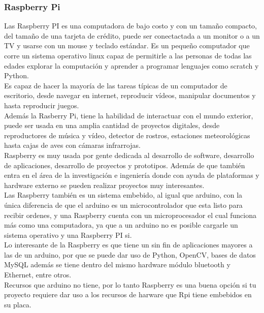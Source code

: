 \documentclass[12pt,titlepage]{article}
\begin{document}
\subsubsection{Raspberry Pi}
Las Raspberry PI es una computadora de bajo costo y con un tamaño compacto, del tamaño de una tarjeta de crédito, puede ser conectactada a un monitor o a un TV y usarse con un mouse y teclado estándar. Es un pequeño computador que corre un sistema operativo linux capaz de permitirle a las personas de todas las edades explorar la computación y aprender a programar lenguajes como scratch y Python. \\ 
Es capaz de hacer la mayoría de las tareas típicas de un computador de escritorio, desde navegar en internet, reproducir vídeos, manipular documentos y hasta reproducir juegos. \\[0.8mm]

Además la Rasberry Pi, tiene la habilidad de interactuar con el mundo exterior, puede ser usada en una amplia cantidad de proyectos digitales, desde reproductores de música y vídeo, detector de rostros, estaciones meteorológicas hasta cajas de aves con cámaras infrarrojas. \\[0.8mm]

Raspberry es muy usada por gente dedicada al desarrollo de software, desarrollo de aplicaciones, desarrollo de proyectos y prototipos. Además de que también entra en el área de la investigación e ingeniería donde con ayuda de plataformas y hardware externo se pueden realizar proyectos muy interesantes. \\[0.8mm]

Las Raspberry también es un sistema embebido, al igual que arduino, con la única diferencia de que el arduino es un microcontrolador que esta listo para recibir ordenes, y una Raspberry cuenta con un microprocesador el cual funciona más como una computadora, ya que a un arduino no es posible cargarle un sistema operativo y  una Raspberry PI si.\\ 

Lo interesante de la Raspberry es que tiene un sin fin de aplicaciones mayores a las de un arduino, por que se puede dar uso de Python, OpenCV, bases de datos MySQL además se tiene dentro del mismo hardware módulo bluetooth y Ethernet, entre otros.\\ 

Recursos que arduino no tiene, por lo tanto Raspberry es una buena opción si tu proyecto requiere dar uso a los recursos de harware que Rpi tiene embebidos en su placa. \\[0.8mm]
\end{document}
